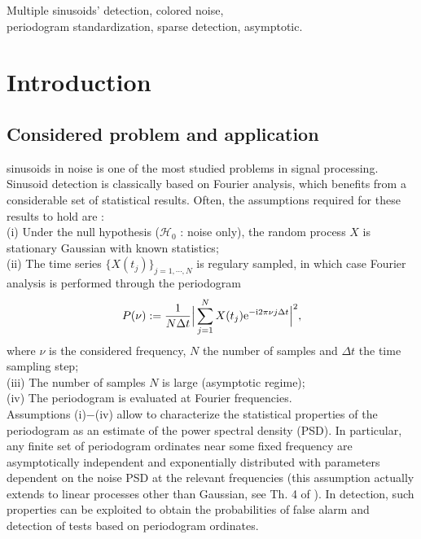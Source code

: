 \documentclass[journal]{IEEEtran}
\begin{document}
\begin{IEEEkeywords}
	 Multiple sinusoids' detection, colored noise, \\periodogram standardization, sparse detection, asymptotic.
\end{IEEEkeywords}

\IEEEpeerreviewmaketitle

\section{Introduction}
\subsection{Considered problem and  application}
\label{secIA}
 sinusoids in noise is one of the most studied problems in signal processing. 
 Sinusoid detection is classically based on Fourier analysis, which benefits  from a 
 considerable set of statistical results. Often, the  assumptions required for these results to hold are :\\
{ (i)} Under the null hypothesis ($\mathcal{H}_0$ : noise only), 
the  random process $X$ is stationary Gaussian with known statistics;\\
{ (ii)} The time series $\{X(t_j)\}_{j=1,\cdots,N}$ is regulary sampled,  in which case Fourier analysis is performed through the 
 periodogram {\cite{Schuster_1898, Brillinger_1981}}
\begin{equation}
\label{eq1}
	P(\nu)   :=  \frac{1}{N\Delta t } \Big| \sum_{j=1}^{N} X(t_j)\mathrm{e}^{-{\rm{i}}2\pi\nu j\Delta t} \Big|  ^2,
\end{equation}
where $\nu$ is the considered frequency, $N$ the number of samples and $\Delta t$ the time sampling step;  \\
(iii) The number of samples $N$ is large (asymptotic regime);\\ 
(iv) The periodogram is evaluated at Fourier frequencies. \\
\indent Assumptions  (i)$-$(iv)  allow to characterize  the statistical properties of the periodogram as an  estimate of the power spectral density (PSD){{\cite{Bartlett_1950, Grenander_1957, Brillinger_1981, Priestley_1981, Brockwell_1991, Bloomfield_2000,Stoica_2005, Quinn_2001}}.
 In particular, any finite set of periodogram ordinates 
 near some fixed frequency 
 are asymptotically independent and exponentially distributed with parameters dependent on the noise PSD at the relevant frequencies (this assumption actually extends to linear processes other than Gaussian, see Th. 4 of \cite{Quinn_2001}).
In detection, such properties can be exploited
to obtain the  probabilities of false alarm and detection of tests based on periodogram ordinates.}
\end{document}
